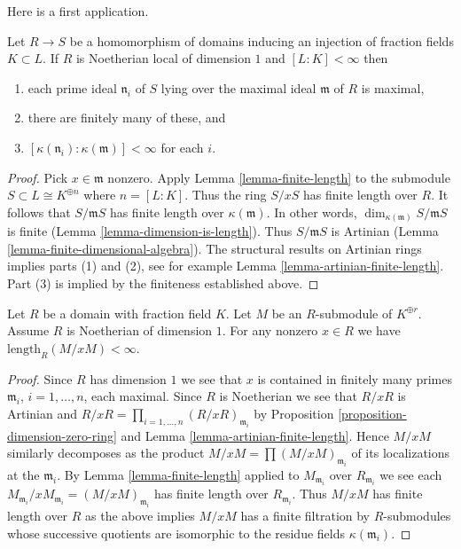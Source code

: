 \noindent
Here is a first application.

\begin{lemma}
\label{lemma-finite-extension-residue-fields-dimension-1}
Let $R \to S$ be a homomorphism of domains inducing an
injection of fraction fields $K \subset L$. If $R$ is Noetherian
local of dimension $1$ and $[L : K] < \infty$ then
\begin{enumerate}
\item each prime ideal $\mathfrak n_i$ of $S$ lying over
the maximal ideal $\mathfrak m$ of $R$ is maximal,
\item there are finitely many of these, and
\item $[\kappa(\mathfrak n_i) : \kappa(\mathfrak m)] < \infty$ for each $i$.
\end{enumerate}
\end{lemma}

\begin{proof}
Pick $x \in \mathfrak m$ nonzero. Apply Lemma \ref{lemma-finite-length}
to the submodule $S \subset L \cong K^{\oplus n}$ where $n = [L : K]$.
Thus the ring $S/xS$ has finite length over $R$. It follows that
$S/\mathfrak m S$ has finite length over $\kappa(\mathfrak m)$.
In other words, $\dim_{\kappa(\mathfrak m)} S/\mathfrak m S$
is finite (Lemma \ref{lemma-dimension-is-length}). Thus $S/\mathfrak mS$
is Artinian (Lemma \ref{lemma-finite-dimensional-algebra}). The
structural results on Artinian rings implies parts (1) and (2), see
for example Lemma \ref{lemma-artinian-finite-length}.
Part (3) is implied by the finiteness established above.
\end{proof}

\begin{lemma}
\label{lemma-finite-length-global}
Let $R$ be a domain with fraction field $K$.
Let $M$ be an $R$-submodule of $K^{\oplus r}$.
Assume $R$ is Noetherian of dimension $1$.
For any nonzero $x \in R$ we have
$\text{length}_R(M/xM) < \infty$.
\end{lemma}

\begin{proof}
Since $R$ has dimension $1$ we see that $x$ is contained in finitely many
primes $\mathfrak m_i$, $i = 1, \ldots, n$, each maximal. Since $R$ is
Noetherian we see that $R/xR$ is Artinian and
$R/xR = \prod_{i = 1, \ldots, n} (R/xR)_{\mathfrak m_i}$ by
Proposition \ref{proposition-dimension-zero-ring} and
Lemma \ref{lemma-artinian-finite-length}. Hence $M/xM$ similarly
decomposes as the product $M/xM = \prod (M/xM)_{\mathfrak m_i}$
of its localizations at the $\mathfrak m_i$. By Lemma \ref{lemma-finite-length}
applied to $M_{\mathfrak m_i}$ over $R_{\mathfrak m_i}$ we see each
$M_{\mathfrak m_i}/xM_{\mathfrak m_i} = (M/xM)_{\mathfrak m_i}$
has finite length over $R_{\mathfrak m_i}$. Thus $M/xM$
has finite length over $R$ as the above implies $M/xM$
has a finite filtration by $R$-submodules whose successive
quotients are isomorphic to the residue fields $\kappa(\mathfrak m_i)$.
\end{proof}

